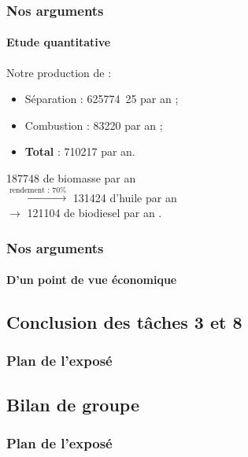 \documentclass{beamer}
\begin{document}
	\begin{frame}
		\frametitle{Nos arguments}
		\framesubtitle{Etude quantitative}
		Notre production de  :
		\begin{itemize}
			\item Séparation : \unit{625774.25}{\ton} par an ;
			\item Combustion : \unit{83220}{\ton} par an ;
			\item \textbf{Total} : \unit{710217}{\ton} par an.
		\end{itemize}
		\unit{187748}{\kilo\gram\per\hectare} de biomasse par an\\
		$\xrightarrow{\text{rendement : 70\%}}$ \unit{131424}{\kilo\gram\per\hectare} d'huile par an \\
		$\rightarrow$ \unit{121104}{\kilo\gram\per\hectare} de biodiesel par an \cite{GeneveVillesEtChamps}\cite{TPEMicroalgue}.
		
	\end{frame}

	\begin{frame}
		\frametitle{Nos arguments}
		\framesubtitle{D'un point de vue économique}
		
	\end{frame}

	\begin{frame}
		\section{Conclusion des tâches 3 et 8}
		\frametitle{Plan de l'exposé}
		\tableofcontents[currentsubsection,sectionstyle=show/shaded,subsectionstyle=show/shaded/hide]
	\end{frame}
	
	\begin{frame}
	        \section{Bilan de groupe}
		\frametitle{Plan de l'exposé}
		\tableofcontents[currentsubsection,sectionstyle=show/shaded,subsectionstyle=show/shaded/hide]
	\end{frame}
	
\end{document}
